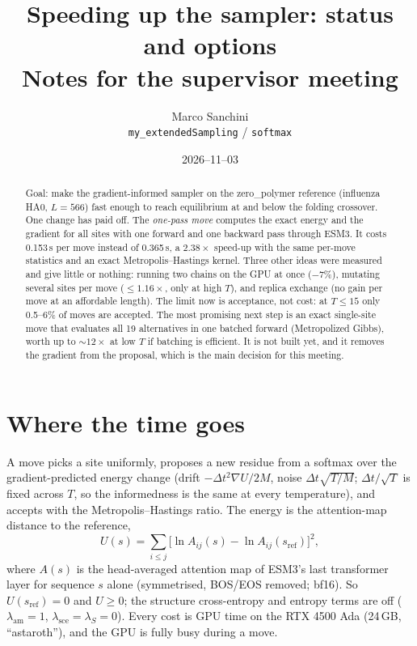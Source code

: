 \documentclass[11pt,a4paper]{article}
\title{Speeding up the sampler: status and options\\
       \large Notes for the supervisor meeting}
\author{Marco Sanchini \\ \small\texttt{my\_extendedSampling} / \texttt{softmax}}
\date{2026--11--03}
\newcommand{\dt}{\Delta t}
\begin{document}
\maketitle

\begin{abstract}
\noindent
Goal: make the gradient-informed sampler on the zero\_polymer reference
(influenza HA0, $L=566$) fast enough to reach equilibrium at and below the
folding crossover. One change has paid off. The \emph{one-pass move} computes
the exact energy and the gradient for all sites with one forward and one
backward pass through ESM3. It costs 0.153\,s per move instead of 0.365\,s,
a $2.38\times$ speed-up with the same per-move statistics and an exact
Metropolis--Hastings kernel. Three other ideas were measured and give little
or nothing: running two chains on the GPU at once ($-7\%$), mutating several
sites per move ($\le1.16\times$, only at high $T$), and replica exchange (no
gain per move at an affordable length). The limit now is acceptance, not cost:
at $T\le15$ only 0.5--6\% of moves are accepted. The most promising next step
is an exact single-site move that evaluates all 19 alternatives in one batched
forward (Metropolized Gibbs), worth up to $\sim12\times$ at low $T$ if batching
is efficient. It is not built yet, and it removes the gradient from the
proposal, which is the main decision for this meeting.
\end{abstract}

\tableofcontents

\section{Where the time goes}

A move picks a site uniformly, proposes a new residue from a softmax over the
gradient-predicted energy change (drift $-\dt^2\nabla U/2M$, noise
$\dt\sqrt{T/M}$; $\dt/\sqrt{T}$ is fixed across $T$, so the informedness is
the same at every temperature), and accepts with the Metropolis--Hastings
ratio. The energy is the attention-map distance to the reference,
\[
U(s)=\sum_{i\le j}\bigl[\ln A_{ij}(s)-\ln A_{ij}(s_{\mathrm{ref}})\bigr]^2 ,
\]
where $A(s)$ is the head-averaged attention map of ESM3's last transformer
layer for sequence $s$ alone (symmetrised, BOS/EOS removed; bf16). So
$U(s_{\mathrm{ref}})=0$ and $U\ge0$; the structure cross-entropy and entropy
terms are off ($\lambda_{\mathrm{am}}=1$, $\lambda_{\mathrm{sce}}=\lambda_S=0$).
Every cost is GPU time on the
RTX 4500 Ada (24\,GB, ``astaroth''), and the GPU is fully busy during a move.
\end{document}

